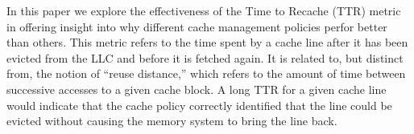 In this paper we explore the effectiveness of the Time to Recache
(TTR) metric in offering insight into why different cache management
policies perfor better than others.  This metric refers
to the time spent by a cache line after it has been evicted from the
LLC and before it is fetched again.  It is related to, but distinct
from, the notion of ``reuse distance,'' which refers to the amount of
time between successive accesses to a given cache block. 
A long TTR for a given cache line would indicate that the cache policy
correctly identified that the line could be evicted without causing
the memory system to bring the line back.
